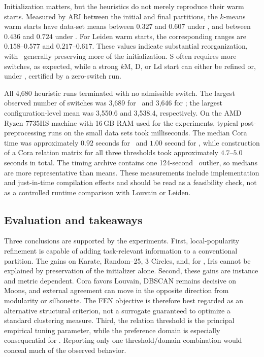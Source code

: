 Initialization matters, but the heuristics do not merely reproduce their warm
starts.  Measured by ARI between the initial and final partitions, the
\(k\)-means warm starts have data-set means between \(0.327\) and \(0.607\)
under \alglocpop, and between \(0.436\) and \(0.724\) under \alglocstab.
For Leiden warm starts, the corresponding ranges are \(0.158\)--\(0.577\) and
\(0.217\)--\(0.617\).  These values indicate substantial reorganization,
with \alglocstab\ generally preserving more of the initialization.  S often
requires more switches, as expected, while a strong \(k\)M, D, or Ld start can
either be refined or, under \alglocstab, certified by a zero-switch run.

All 4,680 heuristic runs terminated with no admissible switch.  The largest
observed number of switches was 3,689 for \alglocpop\ and 3,646 for
\alglocstab; the largest configuration-level mean was 3,550.6 and 3,538.4,
respectively.  On the AMD Ryzen 7735HS machine with 16\,GB RAM used for the
experiments, typical post-preprocessing runs on the small data sets took
milliseconds.  The median Cora time was approximately \(0.92\) seconds for
\alglocpop\ and \(1.00\) second for \alglocstab, while construction of a Cora
relation matrix for all three thresholds took approximately
\(4.7\)--\(5.0\) seconds in total.
The timing archive contains one 124-second \alglocpop\ outlier, so medians are
more representative than means.  These measurements include implementation
and just-in-time compilation effects and should be read as a feasibility check,
not as a controlled runtime comparison with Louvain or Leiden.

\subsection{Evaluation and takeaways}
\label{sec:sim-takeaways}

Three conclusions are supported by the experiments.  First, local-popularity
refinement is capable of adding task-relevant information to a conventional
partition.  The gains on Karate, Random--25, 3 Circles, and, for
\alglocstab, Iris cannot be explained by preservation of the initializer
alone.  Second, these gains are instance and metric dependent.  Cora favors
Louvain, DBSCAN remains decisive on Moons, and external agreement can move in
the opposite direction from modularity or silhouette.  The FEN objective is
therefore best regarded as an alternative structural criterion, not a
surrogate guaranteed to optimize a standard clustering measure.  Third, the
relation threshold is the principal empirical tuning parameter, while the
preference domain is especially consequential for \alglocstab.  Reporting only
one threshold/domain combination would conceal much of the observed behavior.

